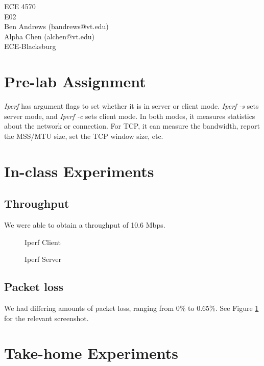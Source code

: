 \documentclass[11pt]{article}
\begin{document}
\begin{flushright}
{ECE 4570}\\{E02}\\{Ben Andrews (bandrews@vt.edu)}\\{Alpha Chen (alchen@vt.edu)}\\{ECE-Blacksburg}\end{flushright}


\section{Pre-lab Assignment}

\emph{Iperf} has argument flags to set whether it is in server or client mode. \emph{Iperf -s} sets server mode, and \emph{Iperf -c} sets client mode. In both modes, it measures statistics about the network or connection. For TCP, it can measure the bandwidth, report the MSS/MTU size, set the TCP window size, etc. 

\section{In-class Experiments}

\subsection{Throughput}

We were able to obtain a throughput of 10.6 Mbps.

\begin{figure}[h]
\centering
{}
\caption{Iperf Client}
\end{figure}

\begin{figure}[h]
\centering
{}
\caption{Iperf Server}
\label{iperf-server}
\end{figure}

\subsection{Packet loss}

We had differing amounts of packet loss, ranging from 0\% to 0.65\%. See Figure \ref{iperf-server} for the relevant screenshot.

\section{Take-home Experiments}
\end{document}
